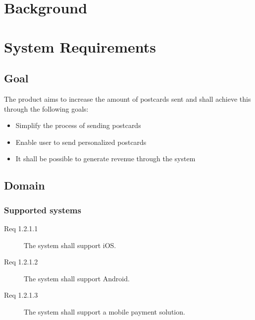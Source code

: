 \documentclass[10pt,a4paper]{article}
\begin{document}
\section{Background}





\section{System Requirements}

\subsection{Goal}
The product aims to increase the amount of postcards sent and shall achieve this through the following goals:
\begin{itemize}
\item Simplify the process of sending postcards
\item Enable user to send personalized postcards
\item It shall be possible to generate revenue through the system
\end{itemize}

\subsection{Domain}
\subsubsection{Supported systems}
\begin {description}
\item [Req 1.2.1.1] The system shall support iOS.
\item [Req 1.2.1.2] The system shall support Android.
\item [Req 1.2.1.3] The system shall support a mobile payment solution. 
\end{description}
\end{document}
